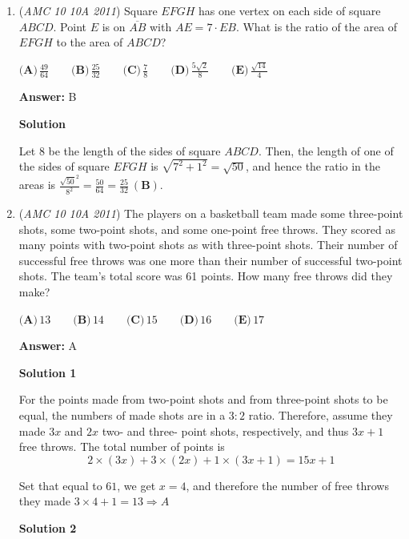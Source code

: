 \begin{enumerate}
 


 


	\item (\textit{AMC 10 10A 2011}) Square $EFGH$ has one vertex on each side of square $ABCD$.  Point $E$ is on $\overline{AB}$ with $AE=7\cdot EB$.  What is the ratio of the area of $EFGH$ to the area of $ABCD$?


 $\textbf{(A)}\,\frac{49}{64}     \qquad\textbf{(B)}\,\frac{25}{32}     \qquad\textbf{(C)}\,\frac78 \qquad\textbf{(D)}\,\frac{5\sqrt{2}}{8}   \qquad\textbf{(E)}\,\frac{\sqrt{14}}{4}$

 \textbf{Answer: }B



\textbf{Solution}

Let $8$ be the length of the sides of square $ABCD$. Then, the length of one of the sides of square $EFGH$ is $\sqrt{7^2+1^2}=\sqrt{50}$, and hence the ratio in the areas is $\frac{\sqrt{50}^2}{8^2}=\frac{50}{64} = \boxed{\frac{25}{32} \ \mathbf{(B)}}$.

 


	\item (\textit{AMC 10 10A 2011}) The players on a basketball team made some three-point shots, some two-point shots, and some one-point free throws.  They scored as many points with two-point shots as with three-point shots.  Their number of successful free throws was one more than their number of successful two-point shots.  The team's total score was 61 points.  How many free throws did they make?


 $\textbf{(A)}\,13 \qquad\textbf{(B)}\,14 \qquad\textbf{(C)}\,15 \qquad\textbf{(D)}\,16 \qquad\textbf{(E)}\,17$

 \textbf{Answer: }A



\textbf{Solution 1}

For the points made from two-point shots and from three-point shots to be equal, the numbers of made shots are in a $3:2$ ratio. Therefore, assume they made $3x$ and $2x$ two- and three- point shots, respectively, and thus $3x+1$ free throws. The total number of points is 
 \[2 \times (3x) + 3 \times (2x) + 1 \times (3x+1) = 15x+1\]

 Set that equal to $61$, we get $x = 4$, and therefore the number of free throws they made $3 \times 4 + 1 = 13 \Rightarrow \boxed{A}$




\textbf{Solution 2}


\end{enumerate}
